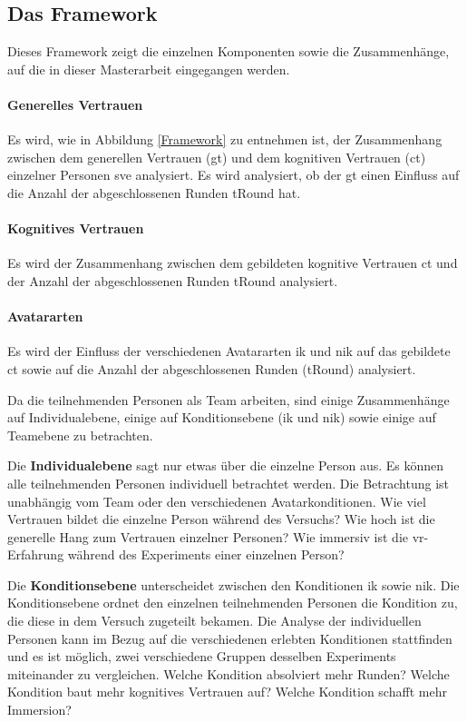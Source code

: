 \documentclass[a4paper,11pt]{article}%
\renewcommand{\\}{\vspace*{0.5\baselineskip} \newline}
\begin{document}
	\subsection{Das Framework}
Dieses Framework zeigt die einzelnen Komponenten sowie die Zusammenhänge, auf die in dieser Masterarbeit eingegangen werden. 
\paragraph{Generelles Vertrauen}
Es wird, wie in Abbildung \ref{Framework} zu entnehmen ist, der Zusammenhang zwischen dem generellen Vertrauen (\ac{gt}) und dem kognitiven Vertrauen (\ac{ct}) einzelner Personen \ac{sve} analysiert.
Es wird analysiert, ob der \ac{gt} einen Einfluss auf die Anzahl der abgeschlossenen Runden \ac{tRound} hat.

\paragraph{Kognitives Vertrauen}
Es wird der Zusammenhang zwischen dem gebildeten kognitive Vertrauen \ac{ct} und der Anzahl der abgeschlossenen Runden \ac{tRound} analysiert.

\paragraph{Avatararten}
Es wird der Einfluss der verschiedenen Avatararten \ac{ik} und \ac{nik} auf das gebildete \ac{ct} sowie auf die Anzahl der abgeschlossenen Runden (\ac{tRound}) analysiert.

Da die teilnehmenden Personen als Team arbeiten, sind einige Zusammenhänge auf Individualebene, einige auf Konditionsebene (\ac{ik} und \ac{nik}) sowie einige auf Teamebene zu betrachten.

Die \textbf{Individualebene} sagt nur etwas über die einzelne Person aus. Es können alle teilnehmenden Personen individuell betrachtet werden. Die Betrachtung ist unabhängig vom Team oder den verschiedenen Avatarkonditionen. Wie viel Vertrauen bildet die einzelne Person während des Versuchs? Wie hoch ist die generelle Hang zum Vertrauen einzelner Personen? Wie immersiv ist die \ac{vr}-Erfahrung während des Experiments einer einzelnen Person?

Die \textbf{Konditionsebene} unterscheidet zwischen den Konditionen \ac{ik} sowie \ac{nik}. Die Konditionsebene ordnet den einzelnen teilnehmenden Personen die Kondition zu, die diese in dem Versuch zugeteilt bekamen. Die Analyse der individuellen Personen kann im Bezug auf die verschiedenen erlebten Konditionen stattfinden und es ist möglich, zwei verschiedene Gruppen desselben Experiments miteinander zu vergleichen. Welche Kondition absolviert mehr Runden? Welche Kondition baut mehr kognitives Vertrauen auf? Welche Kondition schafft mehr Immersion?
\end{document}
